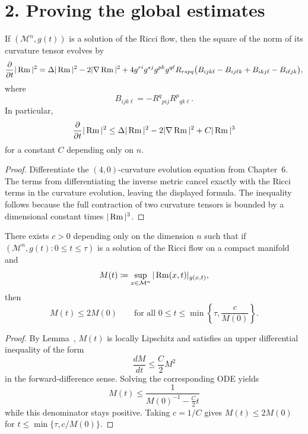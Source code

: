 \section*{2. Proving the global estimates}

\begin{lemma}
\label{ch07-lem-curvature-norm-evolution}
If \((\mathcal M^n,g(t))\) is a solution of the Ricci flow, then the square of the norm of its curvature tensor evolves by
\[
\frac{\partial}{\partial t}|\operatorname{Rm}|^2
=\Delta |\operatorname{Rm}|^2-2|\nabla \operatorname{Rm}|^2
+4g^{ri}g^{sj}g^{pk}g^{q\ell}R_{rspq}\bigl(B_{ijk\ell}-B_{ij\ell k}+B_{ikj\ell}-B_{i\ell jk}\bigr),
\]
where
\[
B_{ijk\ell}=-R^q{}_{pij}R^p{}_{qk\ell}.
\]
In particular,
\[
\frac{\partial}{\partial t}|\operatorname{Rm}|^2\le \Delta |\operatorname{Rm}|^2-2|\nabla \operatorname{Rm}|^2+C|\operatorname{Rm}|^3
\]
for a constant \(C\) depending only on \(n\).
\end{lemma}

\begin{proof}
Differentiate the \((4,0)\)-curvature evolution equation from Chapter~6. The terms from differentiating the inverse metric cancel exactly with the Ricci terms in the curvature evolution, leaving the displayed formula. The inequality follows because the full contraction of two curvature tensors is bounded by a dimensional constant times \(|\operatorname{Rm}|^3\).
\end{proof}

\begin{corollary}
\label{ch07-cor-doubling-time-estimate}
There exists \(c>0\) depending only on the dimension \(n\) such that if \((\mathcal M^n,g(t):0\le t\le \tau)\) is a solution of the Ricci flow on a compact manifold and
\[
M(t)\coloneqq \sup_{x\in\mathcal M^n}|\operatorname{Rm}(x,t)|_{g(x,t)},
\]
then
\[
M(t)\le 2M(0)
\qquad\text{for all }0\le t\le \min\left\{\tau,\frac{c}{M(0)}\right\}.
\]
\end{corollary}

\begin{proof}
By Lemma~, \(M(t)\) is locally Lipschitz and satisfies an upper differential inequality of the form
\[
\frac{dM}{dt}\le \frac{C}{2}M^2
\]
in the forward-difference sense. Solving the corresponding ODE yields
\[
M(t)\le \frac{1}{M(0)^{-1}-\frac C2 t}
\]
while this denominator stays positive. Taking \(c=1/C\) gives \(M(t)\le 2M(0)\) for \(t\le \min\{\tau,c/M(0)\}\).
\end{proof}

